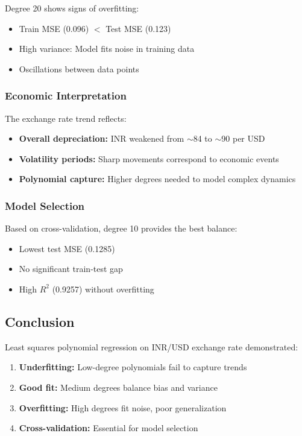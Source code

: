 \documentclass[12pt,a4paper]{article}
\begin{document}
Degree 20 shows signs of overfitting:
\begin{itemize}
    \item Train MSE (0.096) $<$ Test MSE (0.123)
    \item High variance: Model fits noise in training data
    \item Oscillations between data points
\end{itemize}

\subsubsection{Economic Interpretation}

The exchange rate trend reflects:
\begin{itemize}
    \item \textbf{Overall depreciation:} INR weakened from $\sim$84 to $\sim$90 per USD
    \item \textbf{Volatility periods:} Sharp movements correspond to economic events
    \item \textbf{Polynomial capture:} Higher degrees needed to model complex dynamics
\end{itemize}

\subsubsection{Model Selection}

Based on cross-validation, degree 10 provides the best balance:
\begin{itemize}
    \item Lowest test MSE (0.1285)
    \item No significant train-test gap
    \item High $R^2$ (0.9257) without overfitting
\end{itemize}

\subsection{Conclusion}

Least squares polynomial regression on INR/USD exchange rate demonstrated:
\begin{enumerate}
    \item \textbf{Underfitting:} Low-degree polynomials fail to capture trends
    \item \textbf{Good fit:} Medium degrees balance bias and variance
    \item \textbf{Overfitting:} High degrees fit noise, poor generalization
    \item \textbf{Cross-validation:} Essential for model selection
\end{enumerate}
\end{document}
